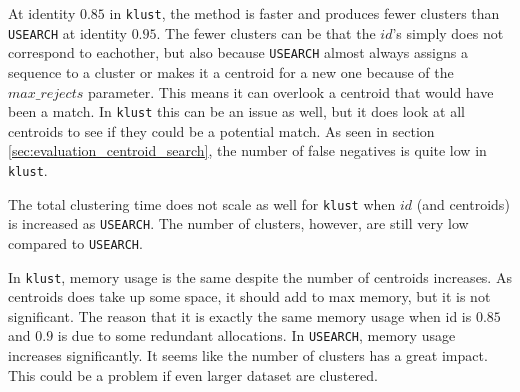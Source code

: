 At identity $0.85$ in \texttt{klust}, the method is faster and produces fewer
clusters than \texttt{USEARCH} at identity $0.95$. The fewer clusters can be
that the $id$'s simply does not correspond to eachother, but also because
\texttt{USEARCH} almost always assigns a sequence to a cluster or makes it a
centroid for a new one because of the $max\_rejects$ parameter. This means it
can overlook a centroid that would have been a match. In \texttt{klust} this
can be an issue as well, but it does look at all centroids to see if they
could be a potential match. As seen in section
\ref{sec:evaluation_centroid_search}, the number of false negatives is quite
low in \texttt{klust}.

The total clustering time does not scale as well for \texttt{klust} when $id$
(and centroids) is increased as \texttt{USEARCH}. The number of clusters,
however, are still very low compared to \texttt{USEARCH}.

In \texttt{klust}, memory usage is the same despite the number of centroids
increases. As centroids does take up some space, it should add to max memory,
but it is not significant. The reason that it is exactly the same memory usage
when id is $0.85$ and $0.9$ is due to some redundant allocations. In \texttt{USEARCH}, memory usage increases significantly. It seems like
the number of clusters has a great impact. This could be a problem if even
larger dataset are clustered.
